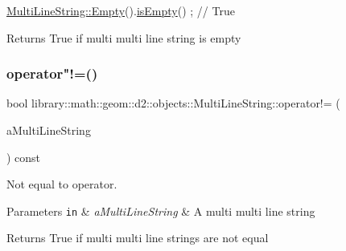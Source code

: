 \begin{DoxyCode}
\hyperlink{classlibrary_1_1math_1_1geom_1_1d2_1_1objects_1_1_multi_line_string_aaa30610df3584b30f80e33ff0f5cd8bb}{MultiLineString::Empty}().\hyperlink{classlibrary_1_1math_1_1geom_1_1d2_1_1objects_1_1_multi_line_string_a41b9e07b94cdbe7c2cc9fc49ce8f2d10}{isEmpty}() ; \textcolor{comment}{// True}
\end{DoxyCode}


\begin{DoxyReturn}{Returns}
True if multi multi line string is empty 
\end{DoxyReturn}
\mbox{\label{classlibrary_1_1math_1_1geom_1_1d2_1_1objects_1_1_multi_line_string_aa3bde774845839971ad6fd89200fdb76}} 
\subsubsection{\texorpdfstring{operator"!=()}{operator!=()}}
{\footnotesize\ttfamily bool library\+::math\+::geom\+::d2\+::objects\+::\+Multi\+Line\+String\+::operator!= (\begin{DoxyParamCaption}\item[{const \hyperlink{classlibrary_1_1math_1_1geom_1_1d2_1_1objects_1_1_multi_line_string}{Multi\+Line\+String} \&}]{a\+Multi\+Line\+String }\end{DoxyParamCaption}) const}



Not equal to operator. 


\begin{DoxyParams}[1]{Parameters}
\mbox{\tt in}  & {\em a\+Multi\+Line\+String} & A multi multi line string \\
\hline
\end{DoxyParams}
\begin{DoxyReturn}{Returns}
True if multi multi line strings are not equal 
\end{DoxyReturn}
\mbox{\label{classlibrary_1_1math_1_1geom_1_1d2_1_1objects_1_1_multi_line_string_abc2730ad53ff446aa68f60b28bbfd396}} 
